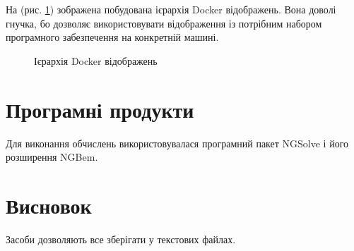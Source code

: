 На (рис. \ref{fig:software_docker_hierarchy}) зображена побудована ієрархія Docker відображень. Вона доволі гнучка, бо
дозволяє використовувати відображення із потрібним набором програмного забезпечення на конкретній машині.

\begin{figure}[ht!]
    \centering
    \caption{Ієрархія Docker відображень}
    \label{fig:software_docker_hierarchy}
\end{figure}


\section{Програмні продукти}

Для виконання обчислень використовувалася програмний пакет NGSolve \cite{software-ngsolve} і його розширення NGBem.

\section{Висновок}

Засоби дозволяють все зберігати у текстових файлах.
